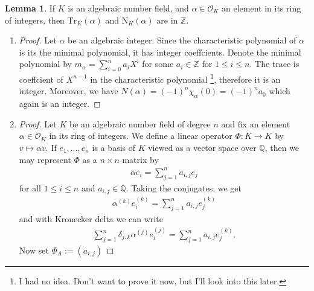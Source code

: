 \documentclass[a4paper]{book}
\theoremstyle{definition}
\newtheorem{lemma}[definition]{Lemma}
\begin{document}
\begin{thmbox}
    \begin{lemma}
        If \(K\) is an algebraic number field, and \(\alpha \in \mathcal{O}_K\) an element in its ring of integers, then \(\mathrm{Tr}_K(\alpha)\) and \(\mathrm{N}_K(\alpha)\) are in \(\mathbb{Z}\).
    \end{lemma}
\end{thmbox}
\begin{enumerate}
    \item \begin{proof} Let \(\alpha\) be an algebraic integer. Since the characteristic polynomial of \(\alpha\) is its the minimal polynomial, it has integer coeffcients. Denote the minimal polynomial by \(m_\alpha = \sum_{i=0}^n a_i X^i\) for some \(a_i \in \mathbb{Z}\) for \(1 \leq i \leq n\). The trace is coeffcient of \(X^{n-1}\) in the characteristic polynomial \footnote{I had no idea. Don't want to prove it now, but I'll look into this later.}, therefore it is an integer. Moreover, we have \(N(\alpha) = (-1)^n \chi_\alpha(0) = (-1)^n a_0\) which again is an integer.
    \end{proof}
    \item \begin{proof}
        Let \(K\) be an algebraic number field of degree \(n\) and fix an element \(\alpha \in \mathcal{O}_K\) in its ring of integers. We define a linear operator \(\Phi: K \longrightarrow K\) by \(v \mapsto \alpha v\). If \(e_1, \ldots, e_n\) is a basis of \(K\) viewed as a vector space over \(\mathbb{Q}\), then we may represent \(\Phi\) as a \(n \times n\) matrix by
        \begin{align*}
            \alpha e_i = \sum_{j=1}^n a_{i, j} e_j
        \end{align*}
        for all \(1 \leq i \leq n\) and \(a_{i, j} \in \mathbb{Q}\). Taking the conjugates, we get
        \begin{align*}
            \alpha^{(k)} e_i^{(k)} = \sum_{j=1}^n a_{i, j} e_j^{(k)}
        \end{align*}
        and with Kronecker delta we can write
        \begin{align*}
            \sum_{j=1}^n \delta_{j, k} \alpha^{(j)} e_i^{(j)} = \sum_{j=1}^n a_{i, j} e_j^{(k)} \text{.}
        \end{align*}
        Now set \(\Phi_A := (a_{i, j})\)
    \end{proof}
\end{enumerate}
\end{document}
